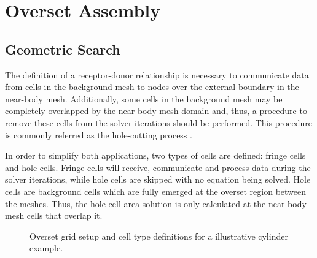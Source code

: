 \section{Overset Assembly}
\subsection{Geometric Search}

The definition of a receptor-donor relationship is necessary to communicate data from cells in the background mesh 
to nodes over the external boundary in the near-body mesh. Additionally, some cells in the background mesh may be completely overlapped by the near-body mesh domain and, thus, a procedure to remove these cells from the solver iterations should be performed. This procedure is commonly referred as the hole-cutting process \cite{Crabill2016, Duan2017}. 

In order to simplify both applications, two types of cells are defined: fringe cells and hole cells. Fringe cells will receive, communicate and process data during the solver iterations, while hole cells are skipped with no equation being solved. Hole cells are background cells which are fully emerged at the overset region between the meshes. Thus, the hole cell area solution is only calculated at the near-body mesh cells that overlap it.

\begin{figure}[H]
	\centering
    \caption{Overset grid setup and cell type definitions for a illustrative cylinder example.}
    \label{fig:overset_setup}
\end{figure}

